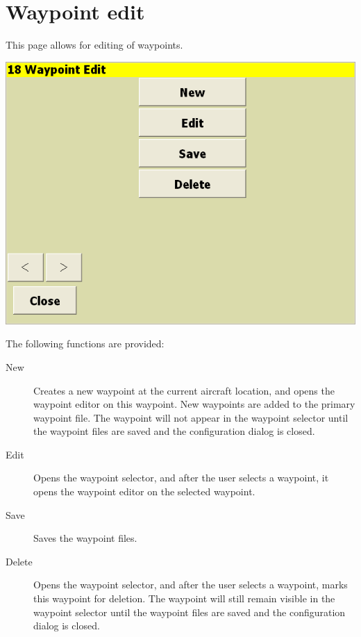 \documentclass[a4paper,12pt]{refrep}
\begin{document}
\clearpage
\section{Waypoint edit}

 This page allows for editing of waypoints.

\begin{center}
\includegraphics[angle=0,width=\linewidth,keepaspectratio='true']{figures/wayedit-1.png}
\end{center}

 The following functions are provided:
\begin{description}
\item[New]  Creates a new waypoint at the current aircraft location, and opens the waypoint
 editor on this waypoint.  New waypoints are added to the primary waypoint file.  
  The waypoint will not appear in the waypoint selector until the waypoint files are saved
and the configuration dialog is closed.
\item[Edit]  Opens the waypoint selector, and after the user selects a waypoint, it opens
  the waypoint editor on the selected waypoint.
\item[Save]  Saves the waypoint files.
\item[Delete]  Opens the waypoint selector, and after the user selects a waypoint, marks
this waypoint for deletion.  The waypoint will still remain visible in
the waypoint selector until the waypoint files are saved and the configuration dialog is
closed.
\end{description}
\end{document}

